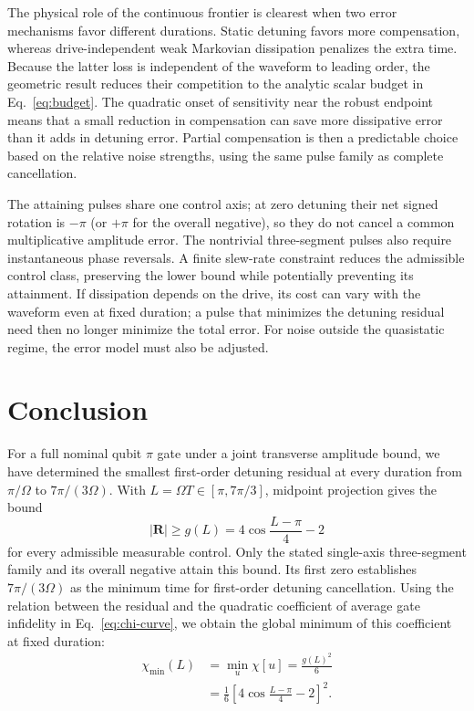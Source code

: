 \documentclass[12pt]{iopjournal}
\newcommand{\Rvec}{\mathbf R}
\begin{document}
The physical role of the continuous frontier is clearest when two
error mechanisms favor different durations. Static detuning favors
more compensation, whereas drive-independent weak Markovian
dissipation penalizes the extra time. Because the latter loss is
independent of the waveform to leading order, the geometric result
reduces their competition to the analytic scalar budget in
Eq.~\eqref{eq:budget}. The quadratic onset of sensitivity near the
robust endpoint means that a small reduction in compensation can
save more dissipative error than it adds in detuning error. Partial
compensation is then a predictable choice based on the relative noise
strengths, using the same pulse family as complete cancellation.

The attaining pulses share one control axis; at zero detuning their
net signed rotation is $-\pi$ (or $+\pi$ for the overall negative), so they do not
cancel a common multiplicative amplitude error. The nontrivial
three-segment pulses also require instantaneous phase reversals.
A finite slew-rate constraint reduces the admissible control class,
preserving the lower bound while potentially preventing its attainment.
If dissipation depends on the drive, its cost can vary with the
waveform even at fixed duration; a pulse that minimizes the detuning
residual need then no longer minimize the total error.
For noise outside the quasistatic regime, the error model must also
be adjusted.

\section{Conclusion}
\label{sec:conclusion}

For a full nominal qubit $\pi$ gate under a joint transverse amplitude
bound, we have determined the smallest first-order detuning residual
at every duration from $\pi/\Omega$ to $7\pi/(3\Omega)$. With
$L=\Omega T\in[\pi,7\pi/3]$, midpoint projection gives the bound
\begin{equation*}
 |\Rvec|\ge g(L)=4\cos\frac{L-\pi}{4}-2
\end{equation*}
for every admissible measurable control. Only the stated single-axis
three-segment family and its overall negative attain this bound.
Its first zero establishes $7\pi/(3\Omega)$ as the minimum time for
first-order detuning cancellation. Using the relation between the
residual and the quadratic coefficient of average gate infidelity in
Eq.~\eqref{eq:chi-curve}, we obtain the global minimum of this
coefficient at fixed duration:
\begin{equation*}
 \begin{aligned}
 \chi_{\min}(L)&=\min_u\chi[u]=\frac{g(L)^2}{6}\\
 &=\frac16\left[4\cos\frac{L-\pi}{4}-2\right]^2.
 \end{aligned}
\end{equation*}
\end{document}
